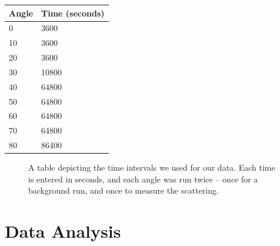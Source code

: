 \documentclass[10pt,letterpaper,onecolumn]{article}
\begin{document}
\begin{table}[tbp]
    \centering
    \begin{tabular}{ll}
    Angle                    & Time (seconds)             \\ \hline
    \multicolumn{1}{|l|}{0}  & \multicolumn{1}{l|}{3600}  \\ \hline
    \multicolumn{1}{|l|}{10} & \multicolumn{1}{l|}{3600}  \\ \hline
    \multicolumn{1}{|l|}{20} & \multicolumn{1}{l|}{3600}  \\ \hline
    \multicolumn{1}{|l|}{30} & \multicolumn{1}{l|}{10800} \\ \hline
    \multicolumn{1}{|l|}{40} & \multicolumn{1}{l|}{64800} \\ \hline
    \multicolumn{1}{|l|}{50} & \multicolumn{1}{l|}{64800} \\ \hline
    \multicolumn{1}{|l|}{60} & \multicolumn{1}{l|}{64800} \\ \hline
    \multicolumn{1}{|l|}{70} & \multicolumn{1}{l|}{64800} \\ \hline
    \multicolumn{1}{|l|}{80} & \multicolumn{1}{l|}{86400} \\ \hline
    \end{tabular}
\end{table}
\begin{figure}
    \caption{A table depicting the time intervals we used for our data. Each time is entered in seconds, and each angle was run twice -- once for a background run, and once to measure the scattering.}
\end{figure}
\section{Data Analysis}
\end{document}
